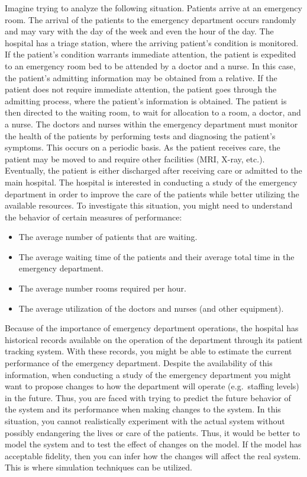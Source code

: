 \documentclass[
]{book}
\theoremstyle{definition}
\theoremstyle{definition}
\theoremstyle{definition}
\theoremstyle{definition}
\theoremstyle{remark}
\begin{document}
Imagine trying to analyze the following situation. Patients arrive at an
emergency room. The arrival of the patients to the emergency department
occurs randomly and may vary with the day of the week and even the hour
of the day. The hospital has a triage station, where the arriving
patient's condition is monitored. If the patient's condition warrants
immediate attention, the patient is expedited to an emergency room bed
to be attended by a doctor and a nurse. In this case, the patient's
admitting information may be obtained from a relative. If the patient
does not require immediate attention, the patient goes through the
admitting process, where the patient's information is obtained. The
patient is then directed to the waiting room, to wait for allocation to
a room, a doctor, and a nurse. The doctors and nurses within the
emergency department must monitor the health of the patients by
performing tests and diagnosing the patient's symptoms. This occurs on a
periodic basis. As the patient receives care, the patient may be moved
to and require other facilities (MRI, X-ray, etc.). Eventually, the
patient is either discharged after receiving care or admitted to the
main hospital. The hospital is interested in conducting a study of the
emergency department in order to improve the care of the patients while
better utilizing the available resources. To investigate this situation,
you might need to understand the behavior of certain measures of
performance:

\begin{itemize}
\item
  The average number of patients that are waiting.
\item
  The average waiting time of the patients and their average total
  time in the emergency department.
\item
  The average number rooms required per hour.
\item
  The average utilization of the doctors and nurses (and other
  equipment).
\end{itemize}

Because of the importance of emergency department operations, the
hospital has historical records available on the operation of the
department through its patient tracking system. With these records, you
might be able to estimate the current performance of the emergency
department. Despite the availability of this information, when
conducting a study of the emergency department you might want to propose
changes to how the department will operate (e.g.~staffing levels) in the
future. Thus, you are faced with trying to predict the future behavior
of the system and its performance when making changes to the system. In
this situation, you cannot realistically experiment with the actual
system without possibly endangering the lives or care of the patients.
Thus, it would be better to model the system and to test the effect of
changes on the model. If the model has acceptable fidelity, then you can
infer how the changes will affect the real system. This is where
simulation techniques can be utilized.
\end{document}
